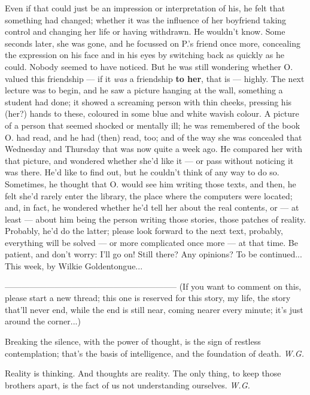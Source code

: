 Even if that could just be an impression or interpretation of his, he felt that something had changed; whether it was the influence of her boyfriend taking control and changing her life or having withdrawn. He wouldn't know. 
Some seconds later, she was gone, and he focussed on P.'s friend once more, concealing the expression on his face and in his eyes by switching back as quickly as he could. 
Nobody seemed to have noticed. 
But he was still wondering whether O. valued this friendship --- if it \emph{was} a friendship \textbf{to her}, that is --- highly. 
The next lecture was to begin, and he saw a picture hanging at the wall, something a student had done; it showed a screaming person with thin cheeks, pressing his (her?) hands to these, coloured in some blue and white wavish colour. A picture of a person that seemed shocked or mentally ill; he was remembered of the book O. had read, and he had (then) read, too; and of the way she was concealed that Wednesday and Thursday that was now quite a week ago. He compared her with that picture, and wondered whether she'd like it --- or pass without noticing it was there. 
He'd like to find out, but he couldn't think of any way to do so. 
Sometimes, he thought that O. would see him writing those texts, and then, he felt she'd rarely enter the library, the place where the computers were located; and, in fact, he wondered whether he'd tell her about the real contents, or --- at least --- about him being the person writing those stories, those patches of reality. 
Probably, he'd do the latter; please look forward to the next text, probably, everything will be solved --- or more complicated once more --- at that time. 
Be patient, and don't worry: I'll go on!
Still there? Any opinions?
To be continued...
This week, by Wilkie Goldentongue...

--------------------------------------------------------------
(If you want to comment on this, please start a new thread; this one is reserved for this story, my life, the story that'll never end, while the end is still near, coming nearer every minute; it's just around the corner...)

Breaking the silence, 
with the power of thought, 
is the sign of restless 
contemplation; 
that's the basis 
of intelligence, 
and the foundation 
of death. 
\emph{W.G.}

Reality 
is thinking. 
And thoughts 
are reality. 
The only thing, 
to keep those brothers 
apart, 
is the fact 
of us not understanding 
ourselves. 
\emph{W.G.}
